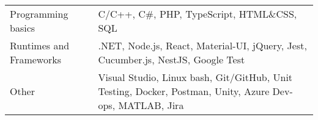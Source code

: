

\vspace{2mm}
\begin{justify}
	\begin{tabularx}{\linewidth}{
			>{\hsize=0.8\hsize}X%
			>{\hsize=1.2\hsize}X%
		}
		Programming basics	 	& C/C++, C\#, PHP, TypeScript, HTML\&CSS, SQL \\
		Runtimes and Frameworks	& .NET, Node.js, React, Material-UI, jQuery, Jest, Cucumber.js, NestJS, Google Test\\
		Other					& Visual Studio, Linux bash, Git/GitHub, Unit Testing, Docker, Postman, Unity, Azure Dev-ops, MATLAB, Jira
	\end{tabularx}
\end{justify}